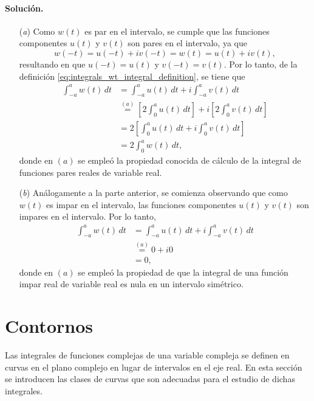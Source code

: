 \documentclass[a4paper]{report}
\begin{document}
\paragraph{Solución.}  
\begin{enumerate}
 \item[(\textit{a})] Como \(w(t)\) es par en el intervalo, se cumple que las funciones componentes \(u(t)\) y \(v(t)\) son pares en el intervalo, ya que 
 \[
  w(-t)=u(-t)+iv(-t)=w(t)=u(t)+iv(t),
 \]
 resultando en que \(u(-t)=u(t)\) y \(v(-t)=v(t)\). Por lo tanto, de la definición \ref{eq:integrals_wt_integral_definition}, se tiene que 
 \begin{align*}
  \int_{-a}^aw(t)\,dt&=\int_{-a}^au(t)\,dt+i\int_{-a}^av(t)\,dt\\
  &\overset{(a)}{=}\left[2\int_0^au(t)\,dt\right]+i\left[2\int_0^av(t)\,dt\right]\\
  &=2\left[\int_0^au(t)\,dt+i\int_0^av(t)\,dt\right]\\
  &=2\int_0^aw(t)\,dt,
 \end{align*}
 donde en \((a)\) se empleó la propiedad conocida de cálculo de la integral de funciones pares reales de variable real.
 \item[(\textit{b})] Análogamente a la parte anterior, se comienza observando que como \(w(t)\) es impar en el intervalo, las funciones componentes \(u(t)\) y \(v(t)\) son impares en el intervalo. Por lo tanto,
 \begin{align*}
  \int_{-a}^aw(t)\,dt&=\int_{-a}^au(t)\,dt+i\int_{-a}^av(t)\,dt\\
  &\overset{(a)}{=}0+i0\\
  &=0,
 \end{align*}
 donde en \((a)\) se empleó la propiedad de que la integral de una función impar real de variable real es nula en un intervalo simétrico.
\end{enumerate} 

\section{Contornos}\label{sec:contours}

Las integrales de funciones complejas de una variable compleja se definen en curvas en el plano complejo en lugar de intervalos en el eje real. En esta sección se introducen las clases de curvas que son adecuadas para el estudio de dichas integrales.
\end{document}
